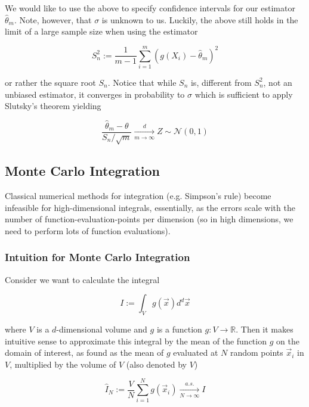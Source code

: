 We would like to use the above to specify confidence intervals for our estimator $\hat{\theta}_m$. Note, however,
that $\sigma$ is unknown to us. Luckily, the above still holds in the limit of a large sample size when using the
estimator

\begin{equation}
    S_n^2 := \frac{1}{m-1} \sum_{i=1}^{m} (g(X_i) - \hat{\theta}_m)^2
\end{equation}

or rather the square root $S_n$. Notice that while $S_n$ is, different from $S_n^2$, not an unbiased estimator, it converges
in probability to $\sigma$ which is sufficient to apply Slutsky's theorem yielding

\begin{equation}
    \frac{\hat{\theta}_m - \theta}{S_n / \sqrt{m}} \xrightarrow[m \rightarrow \infty]{d} Z \sim \mathcal{N}(0, 1)
\end{equation}

\subsection{Monte Carlo Integration}
Classical numerical methods for integration (e.g. Simpson's rule) become infeasible for high-dimensional integrals,
essentially, as the errors scale with the number of function-evaluation-points per dimension (so in high dimensions, we need
to perform lots of function evaluations).

\subsubsection{Intuition for Monte Carlo Integration}
Consider we want to calculate the integral

\begin{equation}
    I := \int_{V} g(\vec{x}) d^d \vec{x}
\end{equation}

where $V$ is a $d$-dimensional volume and $g$ is a function $g: V \rightarrow \mathbb{R}$. Then it makes intuitive sense
to approximate this integral by the mean of the function $g$ on the domain of interest, as found as the mean of $g$ evaluated
at $N$ random points $\vec{x}_i$ in $V$, multiplied by the volume of $V$ (also denoted by $V$)

\begin{equation}
\hat{I}_N := \frac{V}{N} \sum_{i=1}^{N} g(\vec{x}_i) \xrightarrow[N \rightarrow \infty]{a.s.} I
\end{equation}

